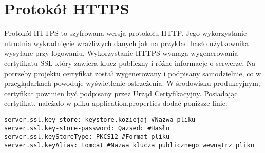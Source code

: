 \documentclass[a4paper,12pt,twoside,openany]{report}
\begin{document}
\section{Protokół HTTPS}
Protokół HTTPS to szyfrowana wersja protokołu HTTP. Jego wykorzystanie utrudnia wykradnięcie wrażliwych danych jak na przykład hasło użytkownika wysyłane przy logowaniu. Wykorzystanie HTTPS wymaga wygenerowania certyfikatu SSL który zawiera klucz publiczny i różne informacje o serwerze. Na potrzeby projektu certyfikat został wygenerowany i podpisany samodzielnie, co w przeglądarkach powoduje wyświetlenie ostrzeżenia. W środowisku produkcyjnym, certyfikat powinien być podpisany przez Urząd Certyfikacyjny. Posiadając certyfikat, należało w pliku application.properties dodać poniższe linie:
\begin{lstlisting}
server.ssl.key-store: keystore.koziejaj #Nazwa pliku
server.ssl.key-store-password: Qazsedc #Hasło
server.ssl.keyStoreType: PKCS12 #Format pliku
server.ssl.keyAlias: tomcat #Nazwa klucza publicznego wewnątrz pliku
\end{lstlisting}
 
\end{document}
